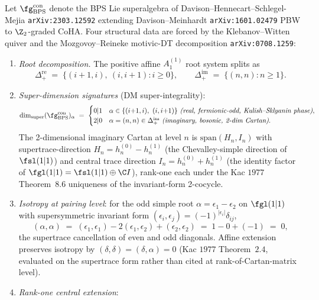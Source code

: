 \begin{proposition}
\label{prop:conifold-super-root-system}
Let $\fg_{\mathrm{BPS}}^{\mathrm{con}}$ denote the BPS Lie superalgebra
of Davison--Hennecart--Schlegel-Mejia \texttt{arXiv:2303.12592}
extending Davison--Meinhardt \texttt{arXiv:1601.02479} PBW to
$\Z_2$-graded CoHA. Four structural data are forced by the
Klebanov--Witten quiver and the Mozgovoy--Reineke motivic-DT
decomposition \texttt{arXiv:0708.1259}:
\begin{enumerate}[label=\textup{(\roman*)}]
\item \emph{Root decomposition.} The positive affine $A_1^{(1)}$ root
 system splits as
 \[
 \Delta_+^{\mathrm{re}} \;=\; \{(i{+}1, i),\ (i, i{+}1) : i \geq 0\},
 \qquad
 \Delta_+^{\mathrm{im}} \;=\; \{(n, n) : n \geq 1\}.
 \]
\item \emph{Super-dimension signatures} \textup{(}DM super-integrality\textup{):}
 \[
 \dim_{\mathrm{super}}(\fg_{\mathrm{BPS}}^{\mathrm{con}})_\alpha
 \;=\;
 \begin{cases}
 0 | 1 & \alpha \in \{(i{+}1, i),\ (i, i{+}1)\}
 \ \textup{\textit{(real, fermionic-odd, Kulish--Sklyanin phase)}}, \\
 2 | 0 & \alpha = (n, n) \in \Delta_+^{\mathrm{im}}
 \ \textup{\textit{(imaginary, bosonic, 2-dim Cartan)}}.
 \end{cases}
 \]
 The 2-dimensional imaginary Cartan at level $n$ is
 $\mathrm{span}(H_n, I_n)$ with supertrace-direction
 $H_n = h^{(0)}_n - h^{(1)}_n$ \textup{(}the Chevalley-simple direction
 of $\fsl(1|1)$\textup{)} and central trace direction
 $I_n = h^{(0)}_n + h^{(1)}_n$ \textup{(}the identity factor of
 $\fgl(1|1) = \fsl(1|1) \oplus \C I$\textup{),} rank-one each under the
 Kac $1977$ Theorem~$8.6$ uniqueness of the invariant-form 2-cocycle.
\item \emph{Isotropy at pairing level}:
 for the odd simple root $\alpha = \epsilon_1 - \epsilon_2$ on
 $\fgl(1|1)$ with supersymmetric invariant form
 $(\epsilon_i, \epsilon_j) = (-1)^{|\epsilon_i|}\delta_{ij}$,
 \[
 (\alpha, \alpha) \;=\; (\epsilon_1, \epsilon_1)
 - 2(\epsilon_1, \epsilon_2) + (\epsilon_2, \epsilon_2)
 \;=\; 1 - 0 + (-1) \;=\; 0,
 \]
 the supertrace cancellation of even and odd diagonals.
 Affine extension preserves isotropy by
 $(\delta, \delta) = (\delta, \alpha) = 0$
 \textup{(}Kac $1977$ Theorem~$2.4$, evaluated on the supertrace
 form rather than cited at rank-of-Cartan-matrix level\textup{).}
\item \emph{Rank-one central extension}:

\end{enumerate}
\end{proposition}
